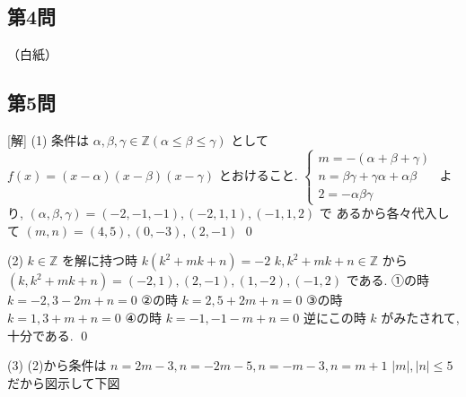 \documentclass[../main.tex]{subfiles}
\begin{document}
\begin{center}
\end{center}

\subsection*{第4問}
（白紙）

\subsection*{第5問}
[解] (1) 条件は $\alpha, \beta, \gamma \in \mathbb{Z} (\alpha \le \beta \le \gamma)$ として
$f(x) = (x-\alpha)(x-\beta)(x-\gamma)$ とおけること.
$
\begin{cases}
  m = -(\alpha + \beta + \gamma) \\
  n = \beta\gamma + \gamma\alpha + \alpha\beta \\
  2 = -\alpha\beta\gamma
\end{cases}$
より, $(\alpha, \beta, \gamma) = (-2, -1, -1), (-2, 1, 1), (-1, 1, 2)$ で
あるから各々代入して
$(m, n) = (4, 5), (0, -3), (2, -1)$ \qed

(2) $k \in \mathbb{Z}$ を解に持つ時
$k(k^2 + mk + n) = -2$
$k, k^2 + mk + n \in \mathbb{Z}$ から
$(k, k^2 + mk + n) = (-2, 1), (2, -1), (1, -2), (-1, 2)$
である.
①の時 $k = -2, 3 - 2m + n = 0$
②の時 $k = 2, 5 + 2m + n = 0$
③の時 $k = 1, 3 + m + n = 0$
④の時 $k = -1, -1 - m + n = 0$
逆にこの時 $k$ がみたされて, 十分である. \qed

(3) (2)から条件は
$n = 2m - 3, n = -2m - 5, n = -m - 3, n = m + 1$
$|m|, |n| \le 5$
だから図示して下図

\begin{center}
\end{center}
\end{document}
